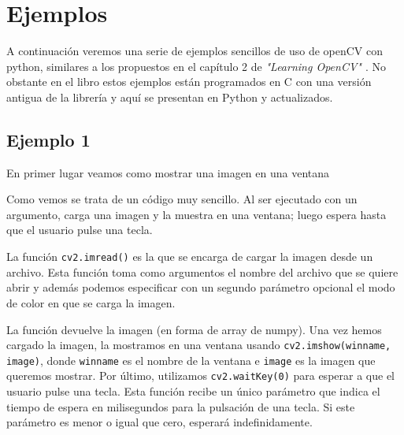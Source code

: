 \documentclass[a4paper,openright, 12pt]{book}
\begin{document}
\section{Ejemplos}
A continuación veremos una serie de ejemplos sencillos de uso de openCV con python, similares a los propuestos en el capítulo 2 de \textit{"Learning OpenCV" \cite{oreilly}}. No obstante en el libro estos ejemplos están programados en C con una versión antigua de la librería y aquí se presentan en Python y actualizados.
\subsection*{Ejemplo 1}
En primer lugar veamos como mostrar una imagen en una ventana

Como vemos se trata de un código muy sencillo. Al ser ejecutado con un argumento, carga una imagen y la muestra en una ventana; luego espera hasta que el usuario pulse una tecla.

La función \lstinline|cv2.imread()| es la que se encarga de cargar la imagen desde un archivo.  Esta función toma como argumentos el nombre del archivo que se quiere abrir y además podemos especificar con un segundo parámetro opcional el modo de color en que se carga la imagen.

La función devuelve la imagen (en forma de array de numpy).
\newline
Una vez hemos cargado la imagen, la mostramos en una ventana usando \lstinline|cv2.imshow(winname, image)|, donde \lstinline|winname| es el nombre de la ventana e \lstinline|image| es la imagen que queremos mostrar.
Por último, utilizamos \lstinline|cv2.waitKey(0)| para esperar a que el usuario pulse una tecla. Esta función recibe un único parámetro que indica el tiempo de espera en milisegundos para la pulsación de una tecla. Si este parámetro es menor o igual que cero, esperará indefinidamente.

\newpage
\end{document}
